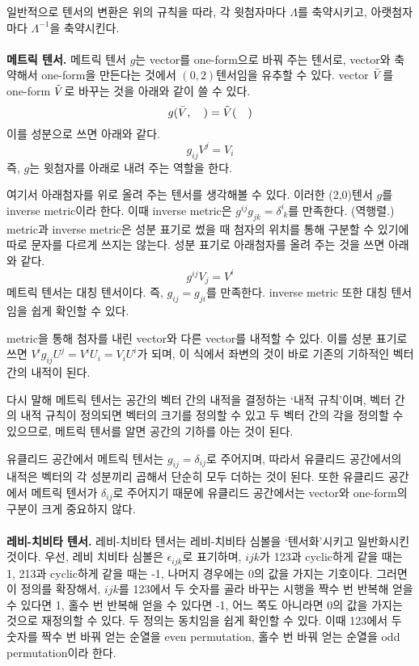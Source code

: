 일반적으로 텐서의 변환은 위의 규칙을 따라, 각 윗첨자마다 $\Lambda$를 축약시키고, 아랫첨자마다 $\Lambda^{-1}$을 축약시킨다.
\\\\
\textbf{메트릭 텐서.}
메트릭 텐서 $g$는 vector를 one-form으로 바꿔 주는 텐서로, vector와 축약해서 one-form을 만든다는 것에서 $(0,2)$텐서임을 유추할 수 있다. vector $\Bar{V}$를 one-form $\Tilde{V}$로 바꾸는 것을 아래와 같이 쓸 수 있다.
\begin{equation}
    g(\Bar{V},\quad)=\Tilde{V}(\quad)
\end{equation}
이를 성분으로 쓰면 아래와 같다.
\begin{equation}
    g_{ij} V^j=V_i
\end{equation}
즉, $g$는 윗첨자를 아래로 내려 주는 역할을 한다.

여기서 아래첨자를 위로 올려 주는 텐서를 생각해볼 수 있다. 이러한 (2,0)텐서 $g$를 inverse metric이라 한다. 이때 inverse metric은 $g^{ij} g_{jk}=\delta^i_{\; k}$를 만족한다. (역행렬.) metric과 inverse metric은 성분 표기로 썼을 때 첨자의 위치를 통해 구분할 수 있기에 따로 문자를 다르게 쓰지는 않는다. 성분 표기로 아래첨자를 올려 주는 것을 쓰면 아래와 같다.
\begin{equation}
    g^{ij}V_j=V^i
\end{equation}
메트릭 텐서는 대칭 텐서이다. 즉, $g_{ij}=g_{ji}$를 만족한다. inverse metric 또한 대칭 텐서임을 쉽게 확인할 수 있다.

metric을 통해 첨자를 내린 vector와 다른 vector를 내적할 수 있다. 이를 성분 표기로 쓰면 $V^ig_{ij}U^j=V^iU_i=V_iU^i$가 되며, 이 식에서 좌변의 것이 바로 기존의 기하적인 벡터 간의 내적이 된다.

다시 말해 메트릭 텐서는 공간의 벡터 간의 내적을 결정하는 `내적 규칙'이며, 벡터 간의 내적 규칙이 정의되면 벡터의 크기를 정의할 수 있고 두 벡터 간의 각을 정의할 수 있으므로, 메트릭 텐서를 알면 공간의 기하를 아는 것이 된다.

유클리드 공간에서 메트릭 텐서는 $g_{ij}=\delta_{ij}$로 주어지며, 따라서 유클리드 공간에서의 내적은 벡터의 각 성분끼리 곱해서 단순히 모두 더하는 것이 된다. 또한 유클리드 공간에서 메트릭 텐서가 $\delta_{ij}$로 주어지기 때문에 유클리드 공간에서는 vector와 one-form의 구분이 크게 중요하지 않다.
\\\\
\textbf{레비-치비타 텐서.}
레비-치비타 텐서는 레비-치비타 심볼을 `텐서화'시키고 일반화시킨 것이다. 우선, 레비 치비타 심볼은 $\epsilon_{ijk}$로 표기하며, $ijk$가 123과 cyclic하게 같을 때는 1, 213과 cyclic하게 같을 때는 -1, 나머지 경우에는 0의 값을 가지는 기호이다. 그러면 이 정의를 확장해서, $ijk$를 123에서 두 숫자를 골라 바꾸는 시행을 짝수 번 반복해 얻을 수 있다면 1, 홀수 번 반복해 얻을 수 있다면 -1, 어느 쪽도 아니라면 0의 값을 가지는 것으로 재정의할 수 있다. 두 정의는 동치임을 쉽게 확인할 수 있다. 이때 123에서 두 숫자를 짝수 번 바꿔 얻는 순열을 even permutation, 홀수 번 바꿔 얻는 순열을 odd permutation이라 한다.

